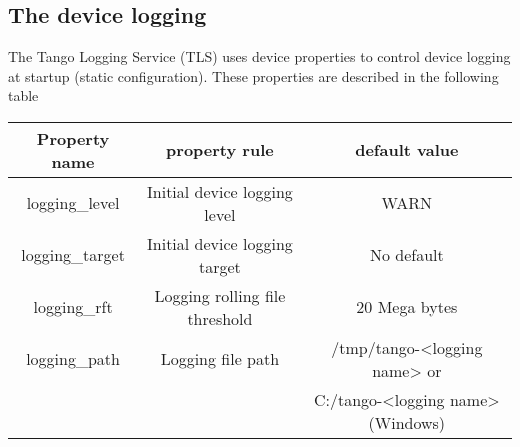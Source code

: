 \subsection{The device logging}

The Tango Logging Service (TLS) uses device properties to control
device logging at startup (static configuration). These properties
are described in the following table 

\vspace{0.3cm}


\begin{center}
\begin{longtable}{|c|c|c|}
\hline 
Property name & property rule & default value\tabularnewline
\hline 
\hline 
logging\_level & Initial device logging level & WARN\tabularnewline
\hline 
logging\_target & Initial device logging target & No default\tabularnewline
\hline 
logging\_rft & Logging rolling file threshold & 20 Mega bytes\tabularnewline
\hline 
logging\_path & Logging file path & \multicolumn{1}{c|}{/tmp/tango-<logging name> or}\tabularnewline
 &  & C:/tango-<logging name> (Windows)\tabularnewline
\hline 
\end{longtable}
\par\end{center}

\vspace{0.3cm}

